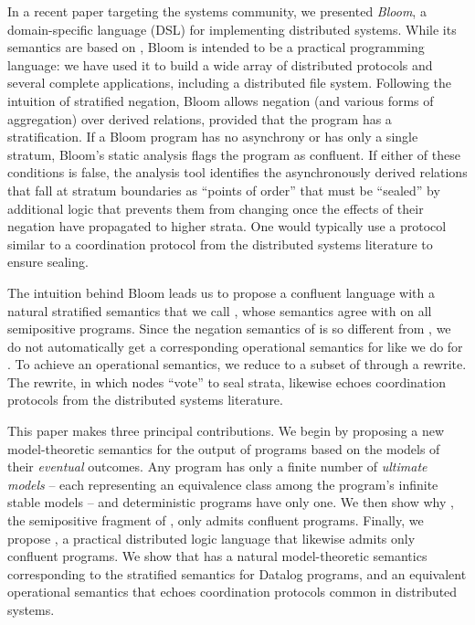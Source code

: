 In a recent paper targeting the systems community, we presented \emph{Bloom}, a domain-specific language (DSL) for implementing distributed 
systems.  While its semantics are based on \lang, Bloom is intended to be a practical programming language: we have used it to build a wide array of distributed protocols and several complete
applications, including a distributed file system.
Following the intuition of stratified negation, Bloom allows negation (and various forms of aggregation) over derived relations, provided that the program has a stratification.
If a Bloom program has no asynchrony or has only a single stratum, Bloom's static analysis flags the 
program as confluent.  If either of these conditions is false, the analysis tool identifies the asynchronously derived relations that fall 
at stratum boundaries as ``points of order'' that must be ``sealed'' by additional logic that prevents them from changing once the effects 
of their negation have propagated to higher strata.  One would typically use a protocol similar to a coordination protocol from the distributed systems literature to ensure sealing.

The intuition behind Bloom leads us to propose a confluent language with a natural stratified semantics that we call \plang, whose semantics agree with \slang on all semipositive \lang programs.  Since the negation semantics of \plang is so different from \lang, we do not automatically get a corresponding operational semantics for \plang like we do for \slang.  To achieve an operational semantics, we reduce \plang to a subset of \lang through a rewrite.  The rewrite, in which nodes ``vote'' to seal strata, likewise echoes coordination protocols from the distributed systems literature.

This paper makes three principal contributions.  We begin by proposing a new model-theoretic semantics for the output of \dedalus 
programs based on the models of their \emph{eventual} outcomes.  
Any \lang program has only a finite number of \emph{ultimate models} -- each representing an equivalence class among the program's infinite stable
models -- and deterministic programs have only one.
We then show why \slang, the semipositive fragment of \lang, only admits confluent programs.  Finally, we propose \plang, a practical distributed logic language that likewise admits only confluent programs.
We show that \plang has a natural model-theoretic semantics corresponding to the stratified semantics for Datalog programs, and an equivalent operational semantics that echoes coordination protocols common in distributed systems.
